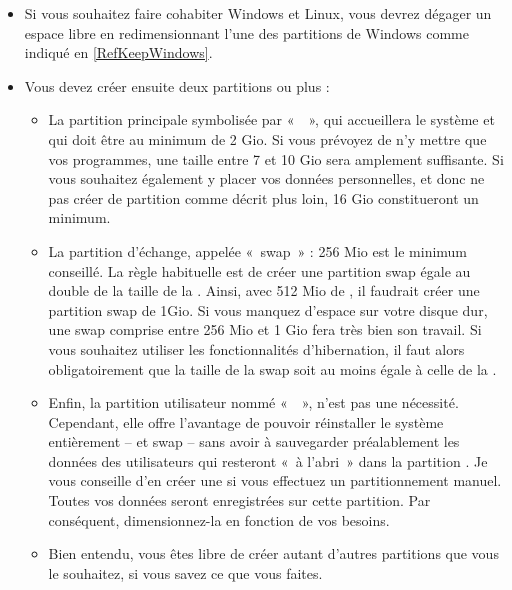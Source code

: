 \begin{itemize}
\item Si vous souhaitez faire cohabiter Windows et Linux, vous devrez dégager un espace libre en redimensionnant l'une des partitions de Windows comme indiqué en \ref{RefKeepWindows}.
\item Vous devez créer ensuite deux partitions ou plus :
\Partitionnement
\begin{itemize}
\item La partition principale symbolisée par «~\Chemin{/}~», qui accueillera le système et qui doit être au minimum de 2 Gio. Si vous prévoyez de n'y mettre que vos programmes, une taille entre 7 et 10 Gio sera amplement suffisante. Si vous souhaitez également y placer vos données personnelles, et donc ne pas créer de partition  comme décrit plus loin, 16 Gio constitueront un minimum.
\item La partition d'échange, appelée «~swap~» : 256 Mio est le minimum conseillé. La règle habituelle est de créer une partition swap égale au double de la taille de la . Ainsi, avec 512 Mio de , il faudrait créer une partition swap de 1Gio. Si vous manquez d'espace sur votre disque dur, une swap comprise entre 256 Mio et 1 Gio fera très bien son travail. Si vous souhaitez utiliser les fonctionnalités d'hibernation, il faut alors obligatoirement que la taille de la swap soit au moins égale à celle de la .
\item Enfin, la partition utilisateur nommé «~~», n'est pas une nécessité. Cependant, elle offre l'avantage de pouvoir réinstaller le système entièrement -- \Chemin{/} et swap -- sans avoir à sauvegarder préalablement les données des utilisateurs qui resteront «~à l'abri~» dans la partition . Je vous conseille d'en créer une si vous effectuez un partitionnement manuel. Toutes vos données seront enregistrées sur cette partition. Par conséquent, dimensionnez-la en fonction de vos besoins.
\item Bien entendu, vous êtes libre de créer autant d'autres partitions que vous le souhaitez, si vous savez ce que vous faites.
\end{itemize}

\end{itemize}

